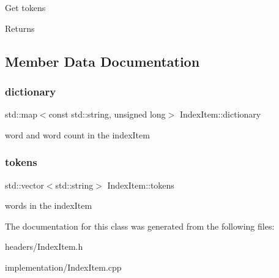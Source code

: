 Get tokens \begin{DoxyReturn}{Returns}

\end{DoxyReturn}


\subsection{Member Data Documentation}
\mbox{\label{classIndexItem_a667ce7eb5e6f22b032dcacd042d89cd3}} 
\subsubsection{\texorpdfstring{dictionary}{dictionary}}
{\footnotesize\ttfamily std\+::map$<$const std\+::string, unsigned long$>$ Index\+Item\+::dictionary\hspace{0.3cm}{\ttfamily [protected]}}

word and word count in the index\+Item \mbox{\label{classIndexItem_a36ee76ec7176493ed48952d6231c29f2}} 
\subsubsection{\texorpdfstring{tokens}{tokens}}
{\footnotesize\ttfamily std\+::vector$<$std\+::string$>$ Index\+Item\+::tokens\hspace{0.3cm}{\ttfamily [protected]}}

words in the index\+Item 

The documentation for this class was generated from the following files\+:\begin{DoxyCompactItemize}
\item 
headers/Index\+Item.\+h\item 
implementation/Index\+Item.\+cpp\end{DoxyCompactItemize}
